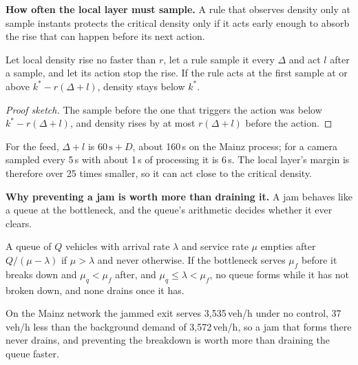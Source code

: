 \noindent\textbf{How often the local layer must sample.} A rule that observes density only at sample instants protects the critical density only if it acts early enough to absorb the rise that can happen before its next action.

\begin{proposition}\label{prop:margin}
Let local density rise no faster than $r$, let a rule sample it every $\Delta$ and act $l$ after a sample, and let its action stop the rise. If the rule acts at the first sample at or above $k^\ast-r(\Delta+l)$, density stays below $k^\ast$.
\end{proposition}

\begin{proof}[Proof sketch]
The sample before the one that triggers the action was below $k^\ast-r(\Delta+l)$, and density rises by at most $r(\Delta+l)$ before the action.
\end{proof}

For the feed, $\Delta+l$ is $60\,\mathrm{s}+D$, about 160\,s on the Mainz process; for a camera sampled every 5\,s with about 1\,s of processing it is 6\,s. The local layer's margin is therefore over 25 times smaller, so it can act close to the critical density.

\noindent\textbf{Why preventing a jam is worth more than draining it.} A jam behaves like a queue at the bottleneck, and the queue's arithmetic decides whether it ever clears.

\begin{proposition}\label{prop:drain}
A queue of $Q$ vehicles with arrival rate $\lambda$ and service rate $\mu$ empties after $Q/(\mu-\lambda)$ if $\mu>\lambda$ and never otherwise. If the bottleneck serves $\mu_f$ before it breaks down and $\mu_q<\mu_f$ after, and $\mu_q\le\lambda<\mu_f$, no queue forms while it has not broken down, and none drains once it has.
\end{proposition}

On the Mainz network the jammed exit serves 3,535\,veh/h under no control, 37\,veh/h less than the background demand of 3,572\,veh/h, so a jam that forms there never drains, and preventing the breakdown is worth more than draining the queue faster.
